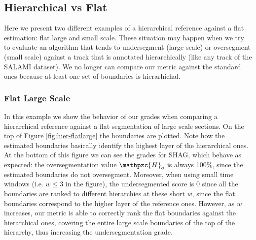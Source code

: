 \documentclass{article}
\begin{document}
\subsection{Hierarchical vs Flat}

Here we present two different examples of a hierarchical reference against a flat estimation: flat large and small scale.
These situation may happen when we try to evaluate an algorithm that tends to undersegment (large scale) or oversegment  (small scale) against a track that is annotated hierarchically (like any track of the SALAMI dataset).
We no longer can compare our metric against the standard ones because at least one set of boundaries is hierarhichal.

\subsubsection{Flat Large Scale}

In this example we show the behavior of our grades when comparing a hierarchical reference against a flat segmentation of large scale sections.
On the top of Figure \ref{fig:hier-flatlarge} the boundaries are plotted.
Note how the estimated boundaries basically identify the highest layer of the hierarchical ones.
At the bottom of this figure we can see the grades for SHAG, which behave as expected: the oversegmentation value $\mathpzc{H}_o$ is always 100\%, since the estimated boundaries do not oversegment.
Moreover, when using small time windows (i.e. $w \leq 3$ in the figure), the undersegmented score is 0 since all the boundaries are ranked to different hierarchies at these short $w$, since the flat boundaries correspond to the higher layer of the reference ones.
However, as $w$ increases, our metric is able to correctly rank the flat boundaries against the hierarchical ones, covering the entire large scale boundaries of the top of the hierarchy, thus increasing the undersegmentation grade.
\end{document}
